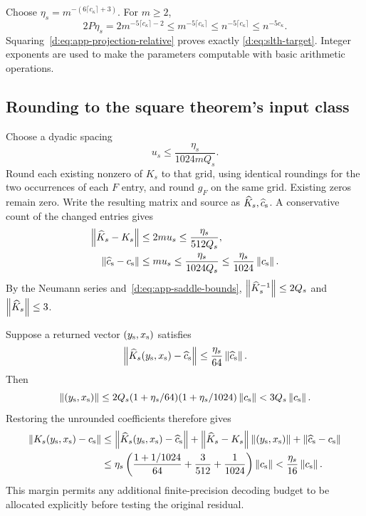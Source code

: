 Choose $\eta_s=m^{-(6\lceil c_\kappa\rceil+3)}$. For $m\ge2$,
\begin{equation}
 2P\eta_s=2m^{-5\lceil c_\kappa\rceil-2}\le m^{-5\lceil c_\kappa\rceil}
                 \le n^{-5\lceil c_\kappa\rceil}\le n^{-5c_\kappa}.
\end{equation}
Squaring~\eqref{d:eq:app-projection-relative} proves exactly
\eqref{d:eq:slth-target}. Integer exponents are used to make the
parameters computable with basic arithmetic operations.

\subsection{Rounding to the square theorem's input class}

Choose a dyadic spacing
\begin{equation}
 u_s\le\frac{\eta_s}{1024mQ_s}.
\end{equation}
Round each existing nonzero of $K_s$ to that grid, using identical
roundings for the two occurrences of each $F$ entry, and round $g_F$ on
the same grid. Existing zeros remain zero. Write the resulting matrix
and source as $\widehat K_s,\widehat c_{\rm s}$. A conservative count of
the changed entries gives
\begin{align}
 \left\lVert \widehat K_s-K_s\right\rVert
   &\le2mu_s\le\frac{\eta_s}{512Q_s},\\
 \left\lVert \widehat c_{\rm s}-c_{\rm s}\right\rVert
   &\le mu_s\le\frac{\eta_s}{1024Q_s}
         \le\frac{\eta_s}{1024}\left\lVert c_{\rm s}\right\rVert.
 \label{d:eq:app-saddle-rounding}
\end{align}
By the Neumann series and~\eqref{d:eq:app-saddle-bounds},
$\left\lVert \widehat K_s^{-1}\right\rVert\le2Q_s$ and
$\left\lVert \widehat K_s\right\rVert\le3$.

Suppose a returned vector $(y_{\rm s},x_{\rm s})$ satisfies
\begin{equation}
 \left\lVert \widehat K_s(y_{\rm s},x_{\rm s})-\widehat c_{\rm s}\right\rVert
 \le\frac{\eta_s}{64}\left\lVert \widehat c_{\rm s}\right\rVert.
\end{equation}
Then
\begin{equation}
 \left\lVert (y_{\rm s},x_{\rm s})\right\rVert
 \le2Q_s(1+\eta_s/64)(1+\eta_s/1024)\left\lVert c_{\rm s}\right\rVert
 <3Q_s\left\lVert c_{\rm s}\right\rVert.
\end{equation}
Restoring the unrounded coefficients therefore gives
\begin{align}
 \left\lVert K_s(y_{\rm s},x_{\rm s})-c_{\rm s}\right\rVert
 &\le\left\lVert \widehat K_s(y_{\rm s},x_{\rm s})-\widehat c_{\rm s}\right\rVert
       +\left\lVert \widehat K_s-K_s\right\rVert\left\lVert (y_{\rm s},x_{\rm s})\right\rVert
       +\left\lVert \widehat c_{\rm s}-c_{\rm s}\right\rVert\\
 &\le\eta_s\left(
       \frac{1+1/1024}{64}+\frac{3}{512}+\frac{1}{1024}
       \right)\left\lVert c_{\rm s}\right\rVert
 <\frac{\eta_s}{16}\left\lVert c_{\rm s}\right\rVert.
 \label{d:eq:app-unrounded-margin}
\end{align}
This margin permits any additional finite-precision decoding budget
to be allocated explicitly before testing the original residual.

